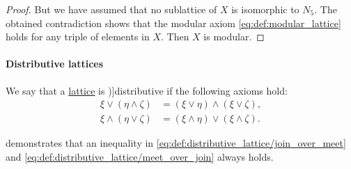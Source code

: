 \begin{proof}
  But we have assumed that no sublattice of \( X \) is isomorphic to \( N_5 \). The obtained contradiction shows that the modular axiom \eqref{eq:def:modular_lattice} holds for any triple of elements in \( X \). Then \( X \) is modular.
\end{proof}

\paragraph{Distributive lattices}

\begin{definition}\label{def:distributive_lattice}
  We say that a \hyperref[def:lattice]{lattice} is \term[ru=дистрибутивная (решётка) (\cite[def. 4.7]{Гуров2013})]{distributive} if the following axioms hold:
  \begin{subequations}
    \begin{align}
      \xi \vee (\eta \wedge \zeta) &= (\xi \vee \eta) \wedge (\xi \vee \zeta), \label{eq:def:distributive_lattice/join_over_meet} \\
      \xi \wedge (\eta \vee \zeta) &= (\xi \wedge \eta) \vee (\xi \wedge \zeta). \label{eq:def:distributive_lattice/meet_over_join}
    \end{align}
  \end{subequations}
\end{definition}
\begin{comments}
  \item {} demonstrates that an inequality in \eqref{eq:def:distributive_lattice/join_over_meet} and \eqref{eq:def:distributive_lattice/meet_over_join} always holds.
\end{comments}


